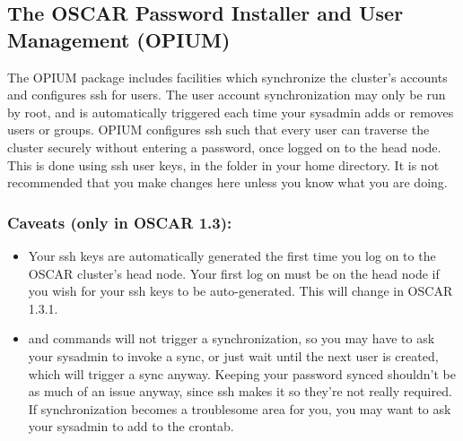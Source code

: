 %
%
%

\subsection{The OSCAR Password Installer and User Management (OPIUM)}
\label{app:opium-overview}

The OPIUM package includes facilities which synchronize the cluster's 
accounts and configures ssh for users.  The user account synchronization
may only be run by root, and is automatically triggered each time your
sysadmin adds or removes users or groups.  OPIUM configures ssh such that
every user can traverse the cluster securely without entering a password,
once logged on to the head node.  This is done using ssh user keys, in
the  folder in your home directory.  It is not recommended that you
make changes here unless you know what you are doing.

\subsubsection{Caveats (only in OSCAR 1.3):}
\begin{itemize}
\item Your ssh keys are automatically generated the first time you log on to
the OSCAR cluster's head node.  Your first log on must be on the head
node if you wish for your ssh keys to be auto-generated.  This will 
change in OSCAR 1.3.1.
\item {} and  commands will not trigger a synchronization,
so you may have to ask your sysadmin to invoke a sync, or
just wait until the next user is created, which will trigger a sync anyway.
Keeping your password synced shouldn't be as much of an issue anyway, since
ssh makes it so they're not really required.  If synchronization becomes
a troublesome area for you, you may want to ask your sysadmin to add
 to the crontab.
\end{itemize}

